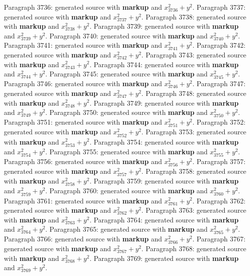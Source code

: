 \documentclass{article}
\begin{document}
Paragraph 3736: generated source with \textbf{markup} and $x_{3736}^2 + y^2$.
Paragraph 3737: generated source with \textbf{markup} and $x_{3737}^2 + y^2$.
Paragraph 3738: generated source with \textbf{markup} and $x_{3738}^2 + y^2$.
Paragraph 3739: generated source with \textbf{markup} and $x_{3739}^2 + y^2$.
Paragraph 3740: generated source with \textbf{markup} and $x_{3740}^2 + y^2$.
Paragraph 3741: generated source with \textbf{markup} and $x_{3741}^2 + y^2$.
Paragraph 3742: generated source with \textbf{markup} and $x_{3742}^2 + y^2$.
Paragraph 3743: generated source with \textbf{markup} and $x_{3743}^2 + y^2$.
Paragraph 3744: generated source with \textbf{markup} and $x_{3744}^2 + y^2$.
Paragraph 3745: generated source with \textbf{markup} and $x_{3745}^2 + y^2$.
Paragraph 3746: generated source with \textbf{markup} and $x_{3746}^2 + y^2$.
Paragraph 3747: generated source with \textbf{markup} and $x_{3747}^2 + y^2$.
Paragraph 3748: generated source with \textbf{markup} and $x_{3748}^2 + y^2$.
Paragraph 3749: generated source with \textbf{markup} and $x_{3749}^2 + y^2$.
Paragraph 3750: generated source with \textbf{markup} and $x_{3750}^2 + y^2$.
Paragraph 3751: generated source with \textbf{markup} and $x_{3751}^2 + y^2$.
Paragraph 3752: generated source with \textbf{markup} and $x_{3752}^2 + y^2$.
Paragraph 3753: generated source with \textbf{markup} and $x_{3753}^2 + y^2$.
Paragraph 3754: generated source with \textbf{markup} and $x_{3754}^2 + y^2$.
Paragraph 3755: generated source with \textbf{markup} and $x_{3755}^2 + y^2$.
Paragraph 3756: generated source with \textbf{markup} and $x_{3756}^2 + y^2$.
Paragraph 3757: generated source with \textbf{markup} and $x_{3757}^2 + y^2$.
Paragraph 3758: generated source with \textbf{markup} and $x_{3758}^2 + y^2$.
Paragraph 3759: generated source with \textbf{markup} and $x_{3759}^2 + y^2$.
Paragraph 3760: generated source with \textbf{markup} and $x_{3760}^2 + y^2$.
Paragraph 3761: generated source with \textbf{markup} and $x_{3761}^2 + y^2$.
Paragraph 3762: generated source with \textbf{markup} and $x_{3762}^2 + y^2$.
Paragraph 3763: generated source with \textbf{markup} and $x_{3763}^2 + y^2$.
Paragraph 3764: generated source with \textbf{markup} and $x_{3764}^2 + y^2$.
Paragraph 3765: generated source with \textbf{markup} and $x_{3765}^2 + y^2$.
Paragraph 3766: generated source with \textbf{markup} and $x_{3766}^2 + y^2$.
Paragraph 3767: generated source with \textbf{markup} and $x_{3767}^2 + y^2$.
Paragraph 3768: generated source with \textbf{markup} and $x_{3768}^2 + y^2$.
Paragraph 3769: generated source with \textbf{markup} and $x_{3769}^2 + y^2$.
\end{document}
